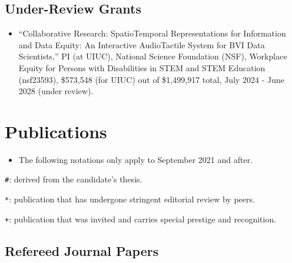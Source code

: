 \documentclass[11pt,a4paper,]{awesome-cv}
\providecommand{\tightlist}{%
	\setlength{\itemsep}{0pt}\setlength{\parskip}{0pt}}
\begin{document}
\subsection{Under-Review Grants}\label{under-review-grants-1}

\begin{itemize}
\tightlist
\item
  ``Collaborative Research: SpatioTemporal Representations for
  Information and Data Equity: An Interactive AudioTactile System for
  BVI Data Scientists,'' PI (at UIUC), National Science Foundation
  (NSF), Workplace Equity for Persons with Disabilities in STEM and STEM
  Education (nsf23593), \$573,548 (for UIUC) out of \$1,499,917 total,
  July 2024 - June 2028 (under review).
\end{itemize}

\section{Publications}\label{publications-1}

\begin{itemize}
\tightlist
\item
  The following notations only apply to September 2021 and after.
\end{itemize}

\texttt{\#}: derived from the candidate's thesis.

\texttt{*}: publication that has undergone stringent editorial review by
peers.

\texttt{+}: publication that was invited and carries special prestige
and recognition.

\subsection{Refereed Journal Papers}\label{refereed-journal-papers-1}
\end{document}
